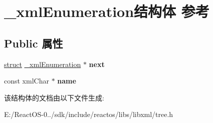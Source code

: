 \hypertarget{struct__xml_enumeration}{}\section{\+\_\+xml\+Enumeration结构体 参考}
\label{struct__xml_enumeration}
\subsection*{Public 属性}
\begin{DoxyCompactItemize}
\item 
\mbox{\label{struct__xml_enumeration_a168deadc881e76af7e2ead0a1348f8cb}} 
\hyperlink{interfacestruct}{struct} \hyperlink{struct__xml_enumeration}{\+\_\+xml\+Enumeration} $\ast$ {\bfseries next}
\item 
\mbox{\label{struct__xml_enumeration_ac88e7e3719444b48a74d79a374455d5f}} 
const xml\+Char $\ast$ {\bfseries name}
\end{DoxyCompactItemize}


该结构体的文档由以下文件生成\+:\begin{DoxyCompactItemize}
\item 
E\+:/\+React\+O\+S-\/0../sdk/include/reactos/libs/libxml/tree.\+h\end{DoxyCompactItemize}

